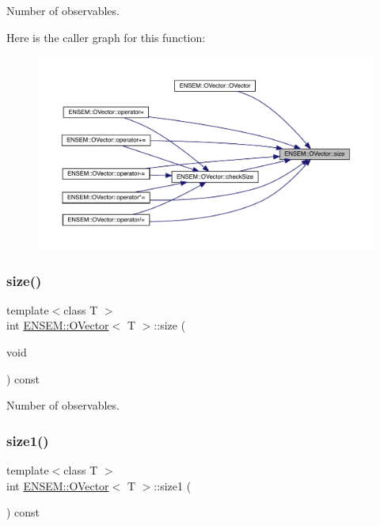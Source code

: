 Number of observables. 

Here is the caller graph for this function\+:\nopagebreak
\begin{figure}[H]
\begin{center}
\leavevmode
\includegraphics[width=350pt]{d0/d8d/classENSEM_1_1OVector_a715979c319905eb60532815bb3c77aab_icgraph}
\end{center}
\end{figure}
\mbox{\label{classENSEM_1_1OVector_a715979c319905eb60532815bb3c77aab}} 
\subsubsection{\texorpdfstring{size()}{size()}\hspace{0.1cm}{\footnotesize\ttfamily [2/2]}}
{\footnotesize\ttfamily template$<$class T $>$ \\
int \mbox{\hyperlink{classENSEM_1_1OVector}{E\+N\+S\+E\+M\+::\+O\+Vector}}$<$ T $>$\+::size (\begin{DoxyParamCaption}\item[{void}]{ }\end{DoxyParamCaption}) const\hspace{0.3cm}{\ttfamily [inline]}}



Number of observables. 

\mbox{\label{classENSEM_1_1OVector_af2035852c6cefe80834b8e2a17648113}} 
\subsubsection{\texorpdfstring{size1()}{size1()}\hspace{0.1cm}{\footnotesize\ttfamily [1/2]}}
{\footnotesize\ttfamily template$<$class T $>$ \\
int \mbox{\hyperlink{classENSEM_1_1OVector}{E\+N\+S\+E\+M\+::\+O\+Vector}}$<$ T $>$\+::size1 (\begin{DoxyParamCaption}{ }\end{DoxyParamCaption}) const\hspace{0.3cm}{\ttfamily [inline]}}



